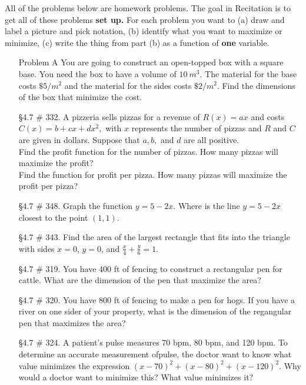 \documentclass[12pt]{article}
\renewcommand{\emph}[1]{\textsf{\textbf{#1}}}
\begin{document}
\addtolength\itemsep{-1mm}
All of the problems below are homework problems. The goal in Recitation is to get all of these problems \emph{set up.} For each problem you want to (a) draw and label a picture and pick notation, (b) identify what you want to maximize or minimize, (c) write the thing from part (b) as a function of \emph{one} variable. 
\begin{enumerate}
\item[Problem A] You are going to construct an open-topped box with a square base. You need the box to have a volume of $10 \: m^3.$ The material for the base costs $ \$ 5 / m^2$ and the material for the sides costs $\$ 2 / m^2.$ Find the dimensions of the box that minimize the cost.
\vfill
\item[\S 4.7 \# 332.] A pizzeria sells pizzas for a revenue of $R(x)=ax$ and costs $C(x)=b+cx+dx^2,$ with $x$ represents the number of pizzas and $R$ and $C$ are given in dollars. Suppose that $a,b,$ and $d$ are all positive.\\
Find the profit function for the number of pizzas. How many pizzas will maximize the profit?\\
Find the function for profit per pizza. How many pizzas will maximize the profit per pizza?\\
\vfill
\item[\S 4.7 \# 348.] Graph the function $y=5-2x.$ Where is the line $y=5-2x$ closest to the point $(1,1).$\\
\vfill
\newpage
\item[\S 4.7 \# 343.] Find the area of the largest rectangle that fits into the triangle with sides $x=0$, $y=0$, and $\frac{x}{4}+\frac{y}{6}=1.$
\vfill
\item[\S 4.7 \# 319.] You have 400 ft of fencing to construct a rectangular pen for cattle. What are the dimension of the pen that maximize the area?
\vfill
\item[\S 4.7 \# 320.] You have 800 ft of fencing to make a pen for hogs. If you have a river on one sider of your property, what is the dimension of the regangular pen that maximizes the area?
\vfill
\item[\S 4.7 \# 324.] A patient's pulse measures 70 bpm, 80 bpm, and 120 bpm. To determine an accurate measurement ofpulse, the doctor want to know what value minimizes the expression $(x-70)^2+(x-80)^2+(x-120)^2.$ Why would a doctor want to minimize this? What value minimizes it?
\vspace{0.3in}
\end{enumerate}
\end{document}
